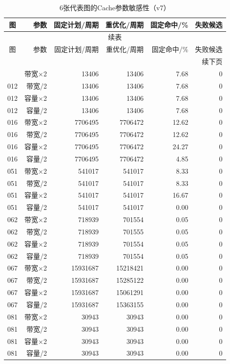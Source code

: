 \begin{longtable}{crrrrr}
\caption{6张代表图的Cache参数敏感性（v7）}\label{tab:sensitivity-detail}\\
\toprule
图 & 参数 & 固定计划/周期 & 重优化/周期 & 固定命中/\% & 失败候选 \\
\midrule
\endfirsthead
\multicolumn{6}{c}{续表}\\
\toprule
图 & 参数 & 固定计划/周期 & 重优化/周期 & 固定命中/\% & 失败候选 \\
\midrule
\endhead
\midrule\multicolumn{6}{r}{续下页}\\
\endfoot
\bottomrule
\endlastfoot
012 & 带宽×2 & 13406 & 13406 & 7.68 & 0 \\
012 & 带宽/2 & 13406 & 13406 & 7.68 & 0 \\
012 & 容量×2 & 13406 & 13406 & 7.68 & 0 \\
012 & 容量/2 & 13406 & 13406 & 7.68 & 0 \\
016 & 带宽×2 & 7706495 & 7706472 & 12.62 & 0 \\
016 & 带宽/2 & 7706495 & 7706472 & 12.62 & 0 \\
016 & 容量×2 & 7706495 & 7706472 & 24.27 & 0 \\
016 & 容量/2 & 7706495 & 7706472 & 4.85 & 0 \\
051 & 带宽×2 & 541017 & 541017 & 8.33 & 0 \\
051 & 带宽/2 & 541017 & 541017 & 8.33 & 0 \\
051 & 容量×2 & 541017 & 541017 & 16.67 & 0 \\
051 & 容量/2 & 541017 & 541017 & 0.00 & 0 \\
062 & 带宽×2 & 718939 & 701554 & 0.05 & 0 \\
062 & 带宽/2 & 718939 & 701555 & 0.05 & 0 \\
062 & 容量×2 & 718939 & 701554 & 0.05 & 0 \\
062 & 容量/2 & 718939 & 701554 & 0.05 & 0 \\
067 & 带宽×2 & 15931687 & 15218421 & 0.00 & 0 \\
067 & 带宽/2 & 15931687 & 15285122 & 0.00 & 0 \\
067 & 容量×2 & 15931687 & 15061291 & 0.00 & 0 \\
067 & 容量/2 & 15931687 & 15363155 & 0.00 & 0 \\
081 & 带宽×2 & 30943 & 30943 & 0.00 & 0 \\
081 & 带宽/2 & 30943 & 30943 & 0.00 & 0 \\
081 & 容量×2 & 30943 & 30943 & 0.00 & 0 \\
081 & 容量/2 & 30943 & 30943 & 0.00 & 0 \\
\end{longtable}
